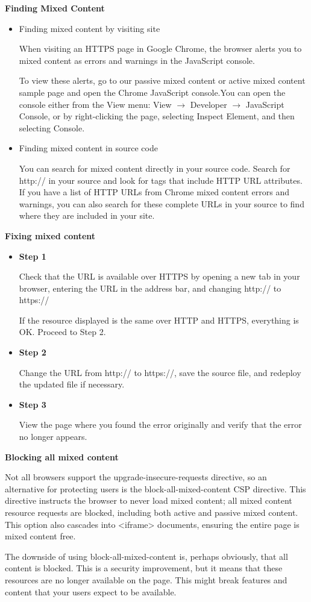 \documentclass[14pt,a4paper,final]{extreport}
\begin{document}
\item \textbf{Finding Mixed Content}
\begin{itemize}
    \item Finding mixed content by visiting site

    When visiting an HTTPS page in Google Chrome, the browser alerts you to mixed content as errors and warnings in the JavaScript console.

    To view these alerts, go to our passive mixed content or active mixed content sample page and open the Chrome JavaScript console.You can open the console either from the View menu: View $\rightarrow$ Developer $\rightarrow$ JavaScript Console, or by right-clicking the page, selecting Inspect Element, and then selecting Console.
    \newline 
    \item Finding mixed content in source code

    You can search for mixed content directly in your source code. Search for http:// in your source and look for tags that include HTTP URL attributes.\newline
    If you have a list of HTTP URLs from Chrome mixed content errors and warnings, you can also search for these complete URLs in your source to find where they are included in your site.
\end{itemize}
\item \textbf{Fixing mixed content}
\begin{itemize}
    \item \textbf{Step 1}

Check that the URL is available over HTTPS by opening a new tab in your browser, entering the URL in the address bar, and changing http:// to https://

If the resource displayed is the same over HTTP and HTTPS, everything is OK. Proceed to Step 2.
    \item \textbf{Step 2}

Change the URL from http:// to https://, save the source file, and redeploy the updated file if necessary.

    \item \textbf{Step 3}

View the page where you found the error originally and verify that the error no longer appears.
\end{itemize}

\item \textbf{Blocking all mixed content}
\item Not all browsers support the upgrade-insecure-requests directive, so an alternative for protecting users is the block-all-mixed-content CSP directive. This directive instructs the browser to never load mixed content; all mixed content resource requests are blocked, including both active and passive mixed content. This option also cascades into <iframe> documents, ensuring the entire page is mixed content free.
\item The downside of using block-all-mixed-content is, perhaps obviously, that all content is blocked. This is a security improvement, but it means that these resources are no longer available on the page. This might break features and content that your users expect to be available.
\end{document}
